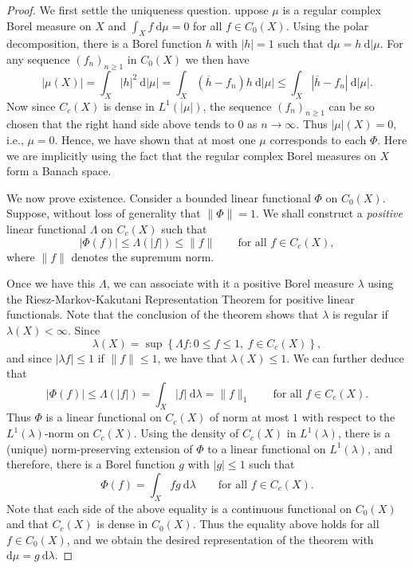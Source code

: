 \documentclass[11pt]{article}
\theoremstyle{thmstyle}
\theoremstyle{defstyle}
\renewcommand{\le}{\leqslant}
\renewcommand{\ge}{\geqslant}
\begin{document}
\begin{proof}
    We first settle the uniqueness question. uppose $\mu$ is a regular complex Borel measure on $X$ and $\displaystyle\int_X f~\mathrm d\mu = 0$ for all $f\in C_0(X)$. Using the polar decomposition, there is a Borel function $h$ with $|h| = 1$ such that $\mathrm d\mu = h~\mathrm d|\mu$. For any sequence $(f_n)_{n\ge 1}$ in $C_0(X)$ we then have 
    \begin{equation*}
        |\mu(X)| = \int_X |h|^2~\mathrm d|\mu| = \int_X (\overline h - f_n)h~\mathrm d|\mu|\le \int_X |\overline h - f_n|~\mathrm d|\mu|.
    \end{equation*}
    Now since $C_c(X)$ is dense in $L^1\left(|\mu|\right)$, the sequence $(f_n)_{n\ge 1}$ can be so chosen that the right hand side above tends to $0$ as $n\to\infty$. Thus $|\mu|(X) = 0$, i.e., $\mu = 0$. Hence, we have shown that at most one $\mu$ corresponds to each $\Phi$. Here we are implicitly using the fact that the regular complex Borel measures on $X$ form a Banach space.

    We now prove existence. Consider a bounded linear functional $\Phi$ on $C_0(X)$. Suppose, without loss of generality that $\|\Phi\| = 1$. We shall construct a \emph{positive} linear functional $\Lambda$ on $C_c(X)$ such that 
    \begin{equation*}
        |\Phi(f)|\le \Lambda(|f|)\le \|f\|\qquad\text{for all }f\in C_c(X),
    \end{equation*}
    where $\|f\|$ denotes the supremum norm.

    Once we have this $\Lambda$, we can associate with it a positive Borel measure $\lambda$ using the Riesz-Markov-Kakutani Representation Theorem for positive linear functionals. Note that the conclusion of the theorem shows that $\lambda$ is regular if $\lambda(X) < \infty$. Since 
    \begin{equation*}
        \lambda(X) = \sup\left\{\Lambda f\colon 0\le f\le 1,~f\in C_c(X)\right\},
    \end{equation*}
    and since $|\lambda f|\le 1$ if $\|f\|\le 1$, we have that $\lambda(X) \le 1$. We can further deduce that 
    \begin{equation*}
        |\Phi(f)|\le\Lambda(|f|) = \int_X |f|~\mathrm d\lambda = \|f\|_1\qquad\text{for all }f\in C_c(X).
    \end{equation*}
    Thus $\Phi$ is a linear functional on $C_c(X)$ of norm at most $1$ with respect to the $L^1(\lambda)$-norm on $C_c(X)$. Using the density of $C_c(X)$ in $L^1(\lambda)$, there is a (unique) norm-preserving extension of $\Phi$ to a linear functional on $L^1(\lambda)$, and therefore, there is a Borel function $g$ with $|g|\le 1$ such that 
    \begin{equation*}
        \Phi(f) = \int_X fg~\mathrm d\lambda \qquad\text{for all }f\in C_c(X).
    \end{equation*}
    Note that each side of the above equality is a continuous functional on $C_0(X)$ and that $C_c(X)$ is dense in $C_0(X)$. Thus the equality above holds for all $f\in C_0(X)$, and we obtain the desired representation of the theorem with $\mathrm d\mu = g~\mathrm d\lambda$.


\end{proof}
\end{document}

